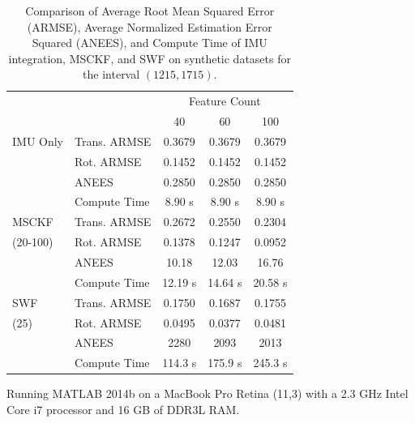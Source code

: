 \documentclass[letterpaper, 10 pt, conference]{ieeeconf}  %
\newcommand\T{\rule{0pt}{2.6ex}}        %
\newcommand\B{\rule[-1.2ex]{0pt}{0pt}} %
\begin{document}
\begin{table}
    \centering
    \caption{Comparison of Average Root Mean Squared Error (ARMSE), Average Normalized Estimation Error Squared (ANEES), and Compute Time of IMU integration, MSCKF, and SWF on synthetic datasets for the interval $(1215,1715)$.}
    \begin{threeparttable}
    \begin{tabular}{llccc} 
                    &                   & \multicolumn{3}{c}{Feature Count} \B      \\ \cline{3-5}
                    &                   & 40        & 60        & 100       \T\B    \\ \hline
        IMU Only    & Trans. ARMSE    & 0.3679    & 0.3679    & 0.3679    \T      \\
                    & Rot. ARMSE    & 0.1452    & 0.1452    & 0.1452            \\
                    & ANEES             & 0.2850    & 0.2850    & 0.2850            \\
                    & Compute Time\tnote{\dag}      & 8.90 s    & 8.90 s    & 8.90 s    \B      \\ \hline
        MSCKF       & Trans. ARMSE    & 0.2672    & 0.2550    & 0.2304    \T      \\
        (20-100)            & Rot. ARMSE    & 0.1378    & 0.1247    & 0.0952            \\
                    & ANEES             & 10.18     & 12.03     & 16.76             \\
                    & Compute Time\tnote{\dag}     & 12.19 s   & 14.64 s   & 20.58 s   \B      \\ \hline
        SWF         & Trans. ARMSE    & 0.1750    & 0.1687    & 0.1755    \T      \\
         (25)       & Rot. ARMSE    & 0.0495    & 0.0377    & 0.0481            \\
                    & ANEES             & 2280      & 2093      & 2013              \\
                    & Compute Time\tnote{\dag}     & 114.3 s   & 175.9 s   & 245.3 s   \B      \\ \hline
    \end{tabular}
    \begin{tablenotes}
        \item [\dag] Running MATLAB 2014b on a MacBook Pro Retina (11,3) with a 2.3 GHz Intel Core i7 processor and 16 GB of DDR3L RAM.
    \end{tablenotes}
    \end{threeparttable}
    \label{tab:rmse_nees}
\end{table}
\end{document}
